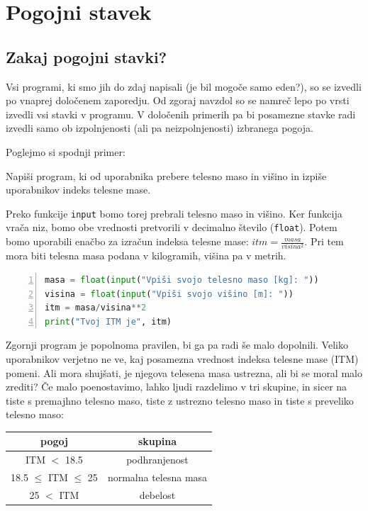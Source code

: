 \chapter{Pogojni stavek}

\section{Zakaj pogojni stavki?}

Vsi programi, ki smo jih do zdaj napisali (je bil mogoče samo eden?), so se izvedli po vnaprej določenem zaporedju. Od zgoraj navzdol so se namreč lepo po vrsti izvedli vsi stavki v programu. V določenih primerih pa bi posamezne stavke radi izvedli samo ob izpolnjenosti (ali pa neizpolnjenosti) izbranega pogoja. 

Poglejmo si spodnji primer:
\begin{zgled}
Napiši program, ki od uporabnika prebere telesno maso in višino in izpiše uporabnikov indeks telesne mase.
\end{zgled}
\begin{resitev}
Preko funkcije \texttt{input} bomo torej prebrali telesno maso in višino. Ker funkcija vrača niz, bomo obe vrednosti pretvorili v decimalno število (\texttt{float}). Potem bomo uporabili enačbo za izračun indeksa telesne mase: $itm = \frac{masa}{visina^2}$. Pri tem mora biti telesna masa podana v kilogramih, višina pa v metrih.
\begin{lstlisting}[language=Python,numbers=left]
masa = float(input("Vpiši svojo telesno maso [kg]: "))
visina = float(input("Vpiši svojo višino [m]: "))
itm = masa/visina**2
print("Tvoj ITM je", itm)
\end{lstlisting}
\end{resitev}

Zgornji program je popolnoma pravilen, bi ga pa radi še malo dopolnili. Veliko uporabnikov verjetno ne ve, kaj posamezna vrednost indeksa telesne mase (ITM) pomeni. Ali mora shujšati, je njegova telesena masa ustrezna, ali bi se moral malo zrediti? Če malo poenostavimo, lahko ljudi razdelimo v tri skupine, in sicer na tiste s premajhno telesno maso, tiste z ustrezno telesno maso in tiste s preveliko telesno maso:

\begin{tabular}{c|c}
     pogoj & skupina \\
     \hline
     ITM $<$ 18.5 & podhranjenost\\
     18.5 $\leq$ ITM $\leq$ 25 & normalna telesna masa\\
     25 $<$ ITM & debelost
\end{tabular}

